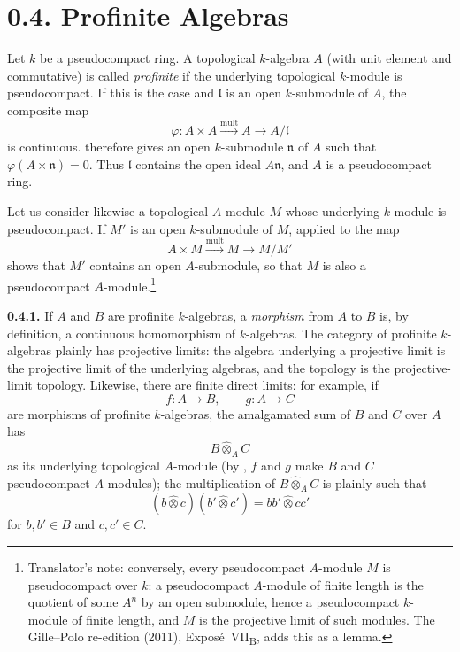 
\section*{0.4. Profinite Algebras}
\label{sga3:VIIB:0.4}

Let \(k\) be a pseudocompact ring. A topological \(k\)-algebra \(A\)
(with unit element and commutative) is called \emph{profinite} if the
underlying topological \(k\)-module is pseudocompact. If this is the case
and \(\mathfrak l\) is an open \(k\)-submodule of \(A\), the composite
map
\[
  \varphi:
  A\times A
  \xrightarrow{\mathrm{mult}}A
  \longrightarrow A/\mathfrak l
\]
is continuous.  therefore gives an open \(k\)-submodule
\(\mathfrak n\) of \(A\) such that
\(\varphi(A\times\mathfrak n)=0\). Thus \(\mathfrak l\) contains the
open ideal \(A\mathfrak n\), and \(A\) is a pseudocompact ring.

Let us consider likewise a topological \(A\)-module \(M\) whose
underlying \(k\)-module is pseudocompact. If \(M'\) is an open
\(k\)-submodule of \(M\),  applied to the map
\[
  A\times M
  \xrightarrow{\mathrm{mult}}M
  \longrightarrow M/M'
\]
shows that \(M'\) contains an open \(A\)-submodule, so that \(M\) is also
a pseudocompact \(A\)-module.\footnote{Translator's note: conversely, every pseudocompact \(A\)-module
\(M\) is pseudocompact over \(k\): a pseudocompact \(A\)-module of finite length is the quotient of some
\(A^n\) by an open submodule, hence a pseudocompact \(k\)-module of finite length, and \(M\) is the
projective limit of such modules. The Gille--Polo re-edition (2011), Expos\'e~VII\textsubscript{B}, adds
this as a lemma.}

\medskip
\noindent\textbf{0.4.1.}
\label{sga3:VIIB:0.4.1}
If \(A\) and \(B\) are profinite \(k\)-algebras, a \emph{morphism}
from \(A\) to \(B\) is, by definition, a continuous homomorphism of
\(k\)-algebras. The category of profinite \(k\)-algebras plainly has
projective limits: the algebra underlying a projective limit is the
projective limit of the underlying algebras, and the topology is the
projective-limit topology. Likewise, there are finite direct limits: for
example, if
\[
  f:A\longrightarrow B,
  \qquad
  g:A\longrightarrow C
\]
are morphisms of profinite \(k\)-algebras, the amalgamated sum of
\(B\) and \(C\) over \(A\) has
\[
  B\widehat{\otimes}_A C
\]
as its underlying topological \(A\)-module (by , \(f\) and \(g\)
make \(B\) and \(C\) pseudocompact \(A\)-modules); the multiplication of
\(B\widehat{\otimes}_AC\) is plainly such that
\[
  (b\widehat{\otimes}c)
  (b'\widehat{\otimes}c')
  =
  bb'\widehat{\otimes}cc'
\]
for \(b,b'\in B\) and \(c,c'\in C\).

